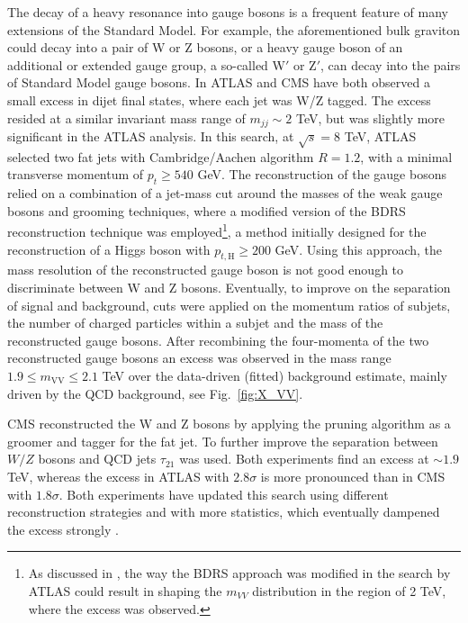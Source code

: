 The decay of a heavy resonance into gauge bosons is a frequent feature of many extensions of the Standard Model. For example, the aforementioned bulk graviton could decay into a pair of W or Z bosons, or a heavy gauge boson of an additional or extended gauge group, a so-called W$'$ or Z$'$, can decay into the pairs of Standard Model gauge bosons. In \cite{Aad:2015owa, Khachatryan:2014hpa} ATLAS and CMS have both observed a small excess in dijet final states, where each jet was W/Z tagged. The excess resided at a similar invariant mass range of $m_{jj} \sim 2$ TeV, but was slightly more significant in the ATLAS analysis.
In this search, at $\sqrt{s}=8$ TeV, ATLAS selected two fat jets with Cambridge/Aachen algorithm $R = 1.2$, with a minimal transverse momentum of $p_t  \geq 540$ GeV. The reconstruction of the gauge bosons relied on a combination of a jet-mass cut around the masses of the weak gauge bosons and grooming techniques, where a modified version of the BDRS reconstruction technique \cite{Butterworth:2008iy} was employed\footnote{As discussed in \cite{Krauss:2014yaa}, the way the BDRS approach was modified in the search by ATLAS could result in shaping the $m_{VV}$ distribution in the region of 2 TeV, where the excess was observed.}, a method initially designed for the reconstruction of a Higgs boson with $p_{t,\text{H}} \geq 200$ GeV. Using this approach, the mass resolution of the reconstructed gauge boson is not good enough to discriminate between W and Z bosons. Eventually, to improve on the separation of signal and background, cuts were applied on the momentum ratios of subjets, the number of charged particles within a subjet and the mass of the reconstructed gauge bosons. After recombining the four-momenta of the two reconstructed gauge bosons an excess was observed in the mass range $1.9 \leq m_\text{VV} \leq 2.1$ TeV over the data-driven (fitted) background estimate, mainly driven by the QCD background, see Fig.~\ref{fig:X_VV}.

CMS reconstructed the W and Z bosons by applying the pruning algorithm as a groomer and tagger for the fat jet. To further improve the separation between $W/Z$ bosons and QCD jets $\tau_{21}$ was used. Both experiments find an excess at $\sim 1.9$ TeV, whereas the excess in ATLAS with $2.8 \sigma$ is more pronounced than in CMS with $1.8 \sigma$. Both experiments have updated this search using different reconstruction strategies and with more statistics, which eventually dampened the excess strongly \cite{Aaboud:2017eta, Sirunyan:2017acf}.


